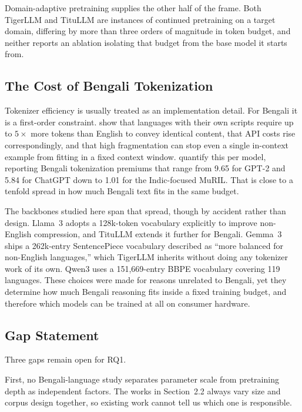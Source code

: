 \documentclass[10pt,twocolumn,letterpaper]{article}
\begin{document}
Domain-adaptive pretraining supplies the other half of the frame. Both TigerLLM
and TituLLM are instances of continued pretraining on a target domain, differing
by more than three orders of magnitude in token budget, and neither reports an
ablation isolating that budget from the base model it starts from.

\subsection{The Cost of Bengali Tokenization}

Tokenizer efficiency is usually treated as an implementation detail. For Bengali
it is a first-order constraint. \textcite{ahia2023alllanguages} %
show that languages with their own scripts require up to $5\times$ more tokens
than English to convey identical content, that API costs rise correspondingly,
and that high fragmentation can stop even a single in-context example from
fitting in a fixed context window. \textcite{petrov2023language} %
quantify this per model, reporting Bengali tokenization premiums that range from
9.65 for GPT-2 and 5.84 for ChatGPT down to 1.01 for the Indic-focused MuRIL.
That is close to a tenfold spread in how much Bengali text fits in the same
budget.

The backbones studied here span that spread, though by accident rather than
design. Llama~3 \parencite{llama3herd} %
adopts a 128k-token vocabulary explicitly to improve non-English compression,
and TituLLM extends it further for Bengali. Gemma~3 \parencite{gemma3} %
ships a 262k-entry SentencePiece vocabulary described as ``more balanced for
non-English languages,'' which TigerLLM inherits without doing any tokenizer
work of its own. Qwen3 \parencite{qwen3} %
uses a 151,669-entry BBPE vocabulary covering 119 languages. These choices were
made for reasons unrelated to Bengali, yet they determine how much Bengali
reasoning fits inside a fixed training budget, and therefore which models can be
trained at all on consumer hardware.

\subsection{Gap Statement}

Three gaps remain open for RQ1.

First, no Bengali-language study separates parameter scale from pretraining
depth as independent factors. The works in Section~2.2 always vary size and
corpus design together, so existing work cannot tell us which one is
responsible.
\end{document}

